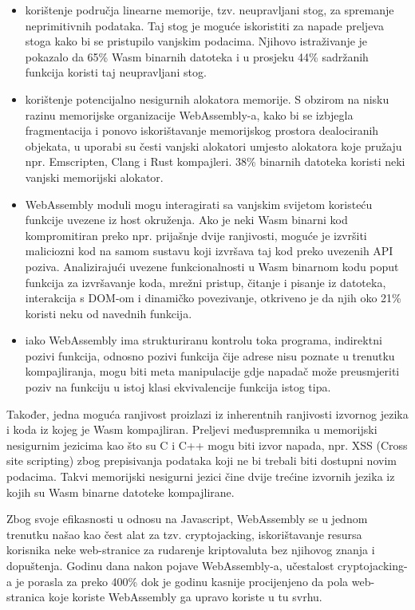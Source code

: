 \documentclass[seminarskirad]{fer}
\begin{document}
\begin{itemize}
	\item korištenje područja linearne memorije, tzv. neupravljani stog, za spremanje neprimitivnih podataka. Taj stog je moguće iskoristiti za napade preljeva stoga kako bi se pristupilo vanjskim podacima. Njihovo istraživanje je pokazalo da 65\% Wasm binarnih datoteka i u prosjeku 44\% sadržanih funkcija koristi taj neupravljani stog.
	\item korištenje potencijalno nesigurnih alokatora memorije. S obzirom na nisku razinu memorijske organizacije WebAssembly-a, kako bi se izbjegla fragmentacija i ponovo iskorištavanje memorijskog prostora dealociranih objekata, u uporabi su česti vanjski alokatori umjesto alokatora koje pružaju npr. Emscripten, Clang i Rust kompajleri. 38\% binarnih datoteka koristi neki vanjski memorijski alokator. 
	\item WebAssembly moduli mogu interagirati sa vanjskim svijetom koristeću funkcije uvezene iz host okruženja. Ako je neki Wasm binarni kod kompromitiran preko npr. prijašnje dvije ranjivosti, moguće je izvršiti maliciozni kod na samom sustavu koji izvršava taj kod preko uvezenih API poziva. Analizirajući uvezene funkcionalnosti u Wasm binarnom kodu poput funkcija za izvršavanje koda, mrežni pristup, čitanje i pisanje iz datoteka, interakcija s DOM-om i dinamičko povezivanje, otkriveno je da njih oko 21\% koristi neku od navednih funkcija.
	\item iako WebAssembly ima strukturiranu kontrolu toka programa, indirektni pozivi funkcija, odnosno pozivi funkcija čije adrese nisu poznate u trenutku kompajliranja, mogu biti meta manipulacije gdje napadač može preusmjeriti poziv na funkciju u istoj klasi ekvivalencije funkcija istog tipa.
\end{itemize}

Također, jedna moguća ranjivost proizlazi iz inherentnih ranjivosti izvornog jezika i koda iz kojeg je Wasm kompajliran. Preljevi međuspremnika u memorijski nesigurnim jezicima kao što su C i C++ mogu biti izvor napada, npr. XSS (Cross site scripting) zbog prepisivanja podataka koji ne bi trebali biti dostupni novim podacima. Takvi memorijski nesigurni jezici čine dvije trećine izvornih jezika iz kojih su Wasm binarne datoteke kompajlirane.

Zbog svoje efikasnosti u odnosu na Javascript, WebAssembly se u jednom trenutku našao kao čest alat za tzv. cryptojacking, iskorištavanje resursa korisnika neke web-stranice za rudarenje kriptovaluta bez njihovog znanja i dopuštenja. Godinu dana nakon pojave WebAssembly-a, učestalost cryptojacking-a je porasla za preko 400\% dok je godinu kasnije procijenjeno da pola web-stranica koje koriste WebAssembly ga upravo koriste u tu svrhu.
\end{document}
